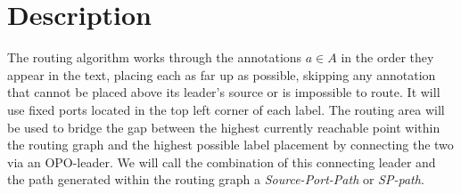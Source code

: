 \documentclass[11pt,a4paper]{vutinfth}
\begin{document}


\section{Description}

The routing algorithm works through the annotations $a \in A$ in the order they appear in the text, placing each as far up as possible, skipping any annotation that cannot be placed above its leader's source or is impossible to route. It will use fixed ports located in the top left corner of each label. 
The routing area will be used to bridge the gap between the highest currently reachable point within the routing graph and the highest possible label placement by connecting the two via an OPO-leader. We will call the combination of this connecting leader and the path generated within the routing graph a \emph{Source-Port-Path} or \emph{SP-path}.%
\end{document}
